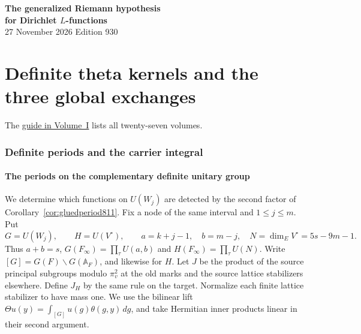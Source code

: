 \documentclass[a4paper,11pt]{article}
\theoremstyle{definition}
\theoremstyle{remark}
\numberwithin{equation}{section}
\begin{document}
\setcounter{part}{14}
\thispagestyle{plain}\begin{center}
{\LARGE\bfseries The generalized Riemann hypothesis\\[2pt]for Dirichlet \(L\)-functions}\\[6pt]
{\small 27 November 2026 \quad\textperiodcentered\quad Edition 930}\end{center}
\part{Definite theta kernels and the three global exchanges}\label{part:XV}
\begin{abstract}\noindent We construct the definite class kernels and their periods. For each of the three theta exchanges we compare the local test factors, the relevant automorphic lines and the normalization of the global integral.\end{abstract}
\setcounter{section}{76}
\noindent The \hyperref[seriesguide]{guide in Volume~I} lists all twenty-seven volumes.
\begingroup\small\setlength{\parskip}{0pt}\tableofcontents\endgroup
\clearpage

\section{Definite periods and the carrier integral}\label{nav:carrier-integral}\label{nav:volume-XV}

\subsection{The periods on the complementary definite unitary group}
\label{sec:complementperiod812}
We determine which functions on \(U(W_j)\) are detected by the
second factor of Corollary~\ref{cor:gluedperiod811}. Fix a node
of the same interval and \(1\le j\le m\). Put
\[
 G=U(W_j),\qquad H=U(V^\circ),\qquad
 a=k+j-1,\quad b=m-j,\quad N=\dim_E V^\circ=5s-9m-1 .
\]
Thus \(a+b=s\), \(G(F_\infty)=\prod_{\tau}U(a,b)\) and
\(H(F_\infty)=\prod_\tau U(N)\). Write \([G]=G(F)\backslash
G(\mathbb A_F)\), and likewise for \(H\). Let \(J\) be the
product of the source principal subgroups modulo \(\pi_v^2\)
at the old marks and the source lattice stabilizers elsewhere.
Define \(J_H\) by the same rule on the target. Normalize each
finite lattice stabilizer to have mass one. We use the bilinear
lift \(\Theta u(y)=\int_{[G]}u(g)\theta(g,y)\,dg\), and take
Hermitian inner products linear in their second argument.
\end{document}
